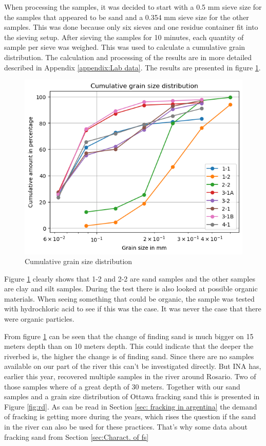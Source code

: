 When processing the samples, it was decided to start with a 0.5 mm sieve size for the samples that appeared to be sand and a 0.354 mm sieve size for the other samples. This was done because only six sieves and one residue container fit into the sieving setup. After sieving the samples for 10 minutes, each quantity of sample per sieve was weighed. This was used to calculate a cumulative grain distribution. The calculation and processing of the results are in more detailed described in Appendix \ref{appendix:Lab data}. The results are presented in figure \ref{fig:Cumu}.

\begin{figure}[H]
    \centering
    \includegraphics[width=0.75\linewidth]{figures//ch6/cumulativegrainsized.png}
    \caption{Cumulative grain size distribution}
    \label{fig:Cumu}
\end{figure}

Figure \ref{fig:Cumu} clearly shows that 1-2 and 2-2 are sand samples and the other samples are clay and silt samples. During the test there is also looked at possible organic materials. When seeing something that could be organic, the sample was tested with hydrochloric acid to see if this was the case. It was never the case that there were organic particles.

From figure \ref{fig:Cumu} can be seen that the change of finding sand is much bigger on 15 meters depth than on 10 meters depth. This could indicate that the deeper the riverbed is, the higher the change is of finding sand. Since there are no samples available on our part of the river this can't be investigated directly. But INA has, earlier this year, recovered multiple samples in the river around Rosario. Two of those samples where of a great depth of 30 meters. Together with our sand samples and a grain size distribution of Ottawa fracking sand this is presented in Figure \ref{fig:rd}. As can be read in Section \ref{sec: fracking in argentina} the demand of fracking is getting more during the years, which rises the question if the sand in the river can also be used for these practices. That's why some data about fracking sand from Section \ref{sec:Charact. of fs}

